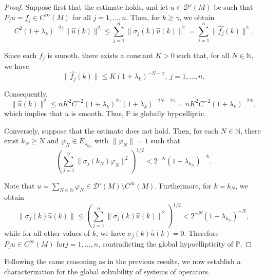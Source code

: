 \documentclass{amsart}
\theoremstyle{definition}
\theoremstyle{remark}
\numberwithin{equation}{section}
\begin{document}
	\begin{proof}
		Suppose first that the estimate holds, and let $u\in\mathscr{D}'(M)$ be such that $P_ju=f_j\in C^\infty(M)$ for all $j=1,\dots,n$. Then, for $k\geq\gamma$, we obtain
		\begin{equation*}
			C^2(1+\lambda_k)^{-2\gamma}\|\widehat{u}(k)\|^2\leq \sum_{j=1}^n\|\sigma_j(k)\widehat{u}(k)\|^2 = \sum_{j=1}^n\|\widehat{f_j}(k)\|^2.
		\end{equation*}
		
		Since each $f_j$ is smooth, there exists a constant $K>0$ such that, for all $N\in\mathbb{N}$, we have  
		\begin{equation*}
			\|\widehat{f_j}(k)\|\leq K(1+\lambda_k)^{-N-\gamma}, \ j=1,\dots,n.
		\end{equation*}
		
		Consequently,  
		\begin{equation*}
			\|\widehat{u}(k)\|^2\leq nK^2C^{-2}(1+\lambda_k)^{2\gamma}(1+\lambda_k)^{-2N-2\gamma} = nK^2C^{-2}(1+\lambda_k)^{-2N},
		\end{equation*}
		which implies that $u$ is smooth. Thus, $\mathbb{P}$ is globally hypoelliptic.  
		
		Conversely, suppose that the estimate does not hold. Then, for each $N\in\mathbb{N}$, there exist $k_N\geq N$ and $\varphi_N\in E_{\lambda_{k_N}}$ with $\|\varphi_N\|=1$ such that
		\begin{equation*}
			\left(\sum_{j=1}^n\|\sigma_j(k_N)\varphi_N\|^2\right)^{1/2} < 2^{-N}(1+\lambda_{k_N})^{-N}.
		\end{equation*}
		
		Note that  $u=\displaystyle\sum_{N\in\mathbb{N}}\varphi_N \in\mathscr{D}'(M)\setminus C^\infty(M)$. 
		Furthermore, for $k = k_N$, we obtain  
		\begin{equation*}
			\|\sigma_j(k)\widehat{u}(k)\|\leq \left(\sum_{j=1}^n\|\sigma_j(k)\widehat{u}(k)\|^2\right)^{1/2}< 2^{-N}(1+\lambda_{k_N})^{-N},
		\end{equation*}
		while for all other values of $k$, we have $\sigma_j(k)\widehat{u}(k)=0$. Therefore $P_j u \in C^\infty(M)$ for$j=1,\dots,n$, contradicting the global hypoellipticity of $\mathbb{P}$.
	\end{proof}
	
	Following the same reasoning as in the previous results, we now establish a characterization for the global solvability of systems of operators.
	
\end{document}
